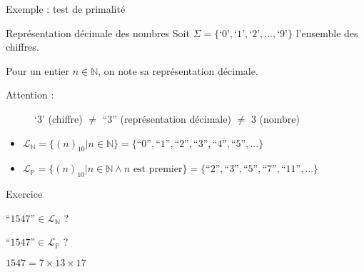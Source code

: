 
\begingroup

\begin{frame}{Exemple : test de primalité}
  \begin{block}{Représentation décimale des nombres}
    Soit $\Sigma = \{\text{`0'}, \text{`1'}, \text{`2'}, ..., \text{`9'}\}$ l'ensemble des chiffres.
    
    Pour un entier $n \in \mathbb{N}$, on note  sa représentation décimale. 
    
    \begin{description}
    \item[\alert{Attention :}] `3' (chiffre) $\neq$ ``3'' (représentation décimale) $\neq$ 3 (nombre)
    \end{description}
    
    \begin{itemize}
    \item $\mathcal{L}_{\mathbb{N}} = \{(n)_{10} | n \in \mathbb{N}\} = \{\text{``0''},\text{``1''},\text{``2''},\text{``3''}, \text{``4''}, \text{``5''}, ...\}$
    \item<2-> $\mathcal{L}_{\mathbb{P}} = \{(n)_{10} | n \in \mathbb{N} \land n \text{ est premier}\} = \{\text{``2''},\text{``3''},\text{``5''}, \text{``7''}, \text{``11''}, ...\}$
    \end{itemize}
  \end{block}
  
  \vspace{3mm} 
  
  \begin{exampleblock}{Exercice}
    \begin{description}
    \item[Question :] $\text{``1547''} \in \mathcal{L}_{\mathbb{N}}$ ?
    \item<2->[Question :] $\text{``1547''} \in \mathcal{L}_{\mathbb{P}}$ ?
    \item<3->[Indication :] $1547 = 7 \times 13 \times 17$ 
    \end{description}
  \end{exampleblock}
  
\end{frame}

\endgroup
